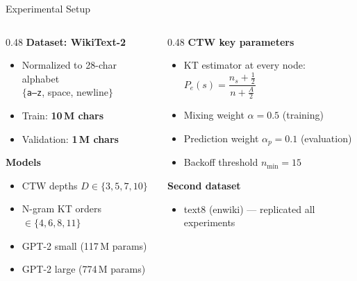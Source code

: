\documentclass[aspectratio=169, 10pt]{beamer}
\begin{document}
\begin{frame}{Experimental Setup}

  \begin{columns}
    \begin{column}{0.48\textwidth}
      \textbf{Dataset: WikiText-2}
      \begin{itemize}
        \item Normalized to 28-char alphabet\\
              $\{$\texttt{a--z}, space, newline$\}$
        \item Train: \textbf{10\,M chars}
        \item Validation: \textbf{1\,M chars}
      \end{itemize}

      \bigskip
      \textbf{Models}
      \begin{itemize}
        \item CTW depths $D \in \{3, 5, 7, 10\}$
        \item N-gram KT orders $\in \{4, 6, 8, 11\}$
        \item GPT-2 small (117\,M params)
        \item GPT-2 large (774\,M params)
      \end{itemize}
    \end{column}
    \begin{column}{0.48\textwidth}
      \textbf{CTW key parameters}
      \begin{itemize}
        \item KT estimator at every node:\\
              $P_e(s) = \dfrac{n_s + \tfrac{1}{2}}{n + \tfrac{A}{2}}$
        \item Mixing weight $\alpha = 0.5$ (training)
        \item Prediction weight $\alpha_p = 0.1$ (evaluation)
        \item Backoff threshold $n_{\min} = 15$
      \end{itemize}

      \bigskip
      \textbf{Second dataset}
      \begin{itemize}
        \item text8 (enwiki) — replicated all experiments
      \end{itemize}
    \end{column}
  \end{columns}
\end{frame}
\end{document}
